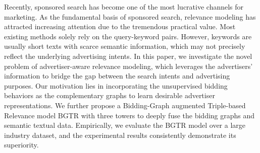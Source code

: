 Recently, sponsored search has become one of the most lucrative channels for marketing. As the fundamental basis of sponsored search, relevance modeling has attracted increasing attention due to the tremendous practical value. Most existing methods solely rely on the query-keyword pairs. However, keywords are usually short texts with scarce semantic information, which may not precisely reflect the underlying advertising intents. In this paper, we investigate the novel problem of advertiser-aware relevance modeling, which leverages the advertisers' information to bridge the gap between the search intents and advertising purposes. Our motivation lies in incorporating the unsupervised bidding behaviors as the complementary graphs to learn desirable advertiser representations. We further propose a Bidding-Graph augmented Triple-based Relevance  model BGTR with three towers to deeply fuse the bidding graphs and semantic textual data. Empirically, we evaluate the BGTR model over a large industry dataset, and the experimental results consistently demonstrate its superiority.
